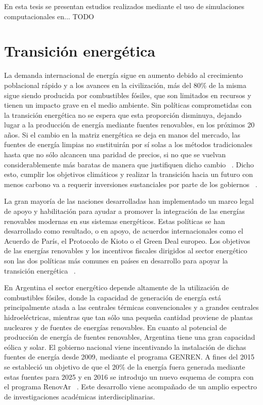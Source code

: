 En esta tesis se presentan estudios realizados mediante el uso de simulaciones 
computacionales en... TODO


\section{Transición energética}

La demanda internacional de energía sigue en aumento debido al crecimiento 
poblacional rápido y a los avances en la civilización, más del 80\% de la misma
sigue siendo producida por combustibles fósiles, que son limitados en recursos 
y tienen un impacto grave en el medio ambiente. Sin políticas comprometidas con 
la transición energética no se espera que esta proporción disminuya, dejando 
lugar a la producción de energía mediante fuentes renovables, en los próximos 20
años. Si el cambio en la matriz energética se deja en manos del mercado, las 
fuentes de energía limpias no sustituirán por sí solas a los métodos tradicionales
hasta que no sólo alcancen una paridad de precios, si no que se vuelvan 
considerablemente más baratas de manera que justifiquen dicho cambio
~\cite{davidson2019}. Dicho esto, cumplir los objetivos climáticos y realizar la 
transición hacia un futuro con menos carbono va a requerir inversiones 
sustanciales por parte de los gobiernos ~\cite{leonhardt2022}.

La gran mayoría de las naciones desarrolladas han implementado un marco legal de 
apoyo y habilitación para ayudar a promover la integración de las energías 
renovables modernas en sus sistemas energéticos. Estas políticas se han 
desarrollado como resultado, o en apoyo, de acuerdos internacionales como el 
Acuerdo de París, el Protocolo de Kioto o el Green Deal europeo. Los objetivos 
de las energías renovables y los incentivos fiscales dirigidos al sector 
energético son las dos políticas más comunes en países en desarrollo para apoyar 
la transición energética ~\cite{cantarero2020}.

En Argentina el sector energético depende altamente de la utilización de 
combustibles fósiles, donde la capacidad de generación de energía está 
principalmente atada a las centrales térmicas convencionales y a grandes 
centrales hidroeléctricas, mientras que tan sólo una pequeña cantidad proviene 
de plantas nucleares y de fuentes de energías renovables. En cuanto al potencial
de producción de energía de fuentes renovables, Argentina tiene una gran 
capacidad eólica y solar. El gobierno nacional viene incentivando la instalación 
de dichas fuentes de energía desde 2009, mediante el programa GENREN. A fines 
del 2015 se estableció un objetivo de que el 20\% de la energía fuera generada
mediante estas fuentes para 2025 y en 2016 se introdujo un nuevo esquema de 
compra con el programa RenovAr ~\cite{schaube2018}. Este desarrollo viene 
acompañado de un amplio espectro de investigaciones académicas 
interdisciplinarias.

